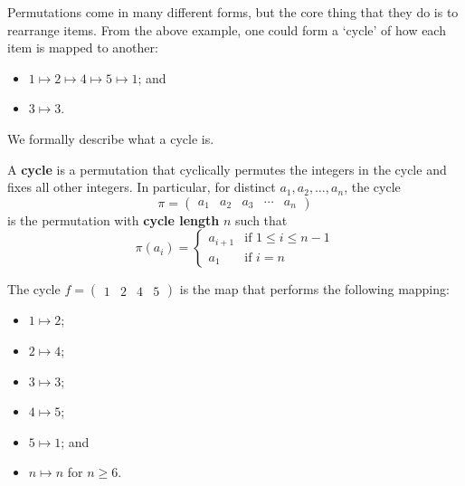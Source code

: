 Permutations come in many different forms, but the core thing that they do is to rearrange items. From the above example, one could form a `cycle' of how each item is mapped to another:
\begin{itemize}
    \item $1 \mapsto 2 \mapsto 4 \mapsto 5 \mapsto 1$; and
    \item $3 \mapsto 3$.
\end{itemize}
We formally describe what a cycle is.
\begin{definition}
    A \textbf{cycle} is a permutation that cyclically permutes the integers in the cycle and fixes all other integers. In particular, for distinct $a_1, a_2, \dots, a_n$, the cycle
    \[
        \pi = \begin{pmatrix}a_1&a_2&a_3&\cdots&a_n\end{pmatrix}
    \]
    is the permutation with \textbf{cycle length} $n$ such that
    \[
        \pi(a_i) = \begin{cases}
            a_{i+1}& \text{if } 1 \leq i \leq n - 1\\
            a_1 & \text{if } i = n
        \end{cases}
    \]
\end{definition}
\begin{example}
    The cycle $f = \begin{pmatrix}1 & 2 & 4 & 5\end{pmatrix}$ is the map that performs the following mapping:
    \begin{multicols}{3}
        \begin{itemize}
            \item $1 \mapsto 2$;
            \item $2 \mapsto 4$;
            \item $3 \mapsto 3$;
            \item $4 \mapsto 5$;
            \item $5 \mapsto 1$; and
            \item $n \mapsto n$ for $n \geq 6$.
        \end{itemize}
    \end{multicols}
\end{example}

